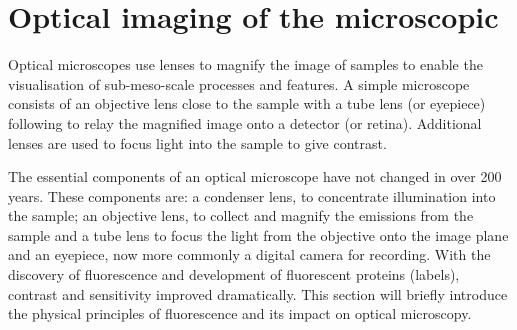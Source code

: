 
\section{Optical imaging of the microscopic}


Optical microscopes use lenses to magnify the image of samples to enable the visualisation of sub-meso-scale processes and features.
A simple microscope consists of an objective lens close to the sample with a tube lens (or eyepiece) following to relay the magnified image onto a detector (or retina).
Additional lenses are used to focus light into the sample to give contrast.


The essential components of an optical microscope have not changed in over 200 years\cite{Bradbury1998,Masters2001b}.
These components are: a condenser lens, to concentrate illumination into the sample; an objective lens, to collect and magnify the emissions from the sample and a tube lens to focus the light from the objective onto the image plane and an eyepiece, now more commonly a digital camera for recording.
With the discovery of fluorescence and development of fluorescent proteins (labels), contrast and sensitivity improved dramatically.
This section will briefly introduce the physical principles of fluorescence and its impact on optical microscopy.


